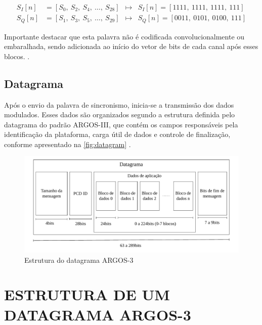 \vspace{-1em}
\begin{equation}
\begin{aligned}
    S_I[n] &= [S_0,\ S_2,\ S_4,\ \dots,\ S_{28}] &\mapsto&  S_I[n] = [1111,\ 1111,\ 1111,\ 111]     \\
    S_Q[n] &= [S_1,\ S_3,\ S_5,\ \dots,\ S_{29}] &\mapsto&  S_Q[n] = [0011,\ 0101,\ 0100,\ 111]
\end{aligned}
\label{eq:intercalacao}
\end{equation}

\noindent Importante destacar que esta palavra não é codificada convolucionalmente ou embaralhada, sendo adicionada ao início do vetor de bits de cada canal após esses blocos.  \cite{cnes_services_and_message_formats_ed2_rev2_2006}. 

\subsection{Datagrama}

Após o envio da palavra de sincronismo, inicia-se a transmissão dos dados modulados. Esses dados são organizados segundo a estrutura definida pelo datagrama do padrão \gls{ARGOS-III}, que contém os campos responsáveis pela identificação da plataforma, carga útil de dados e controle de finalização, conforme apresentado na \autoref{fig:datagram} \cite{cnes_services_and_message_formats_ed2_rev2_2006}.

\begin{figure}[H]
	\centering
	\caption{Estrutura do datagrama ARGOS-3}\label{fig:datagram}
	\includegraphics[width=\linewidth]{assets/cap2/datagram.pdf}
    
\end{figure}

\section{ESTRUTURA DE UM DATAGRAMA ARGOS-3}

